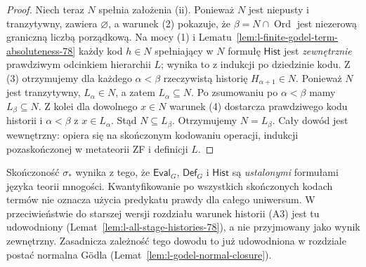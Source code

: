 \begin{proof}
Niech teraz $N$ spełnia założenia (ii).
Ponieważ $N$ jest niepusty i tranzytywny, zawiera
$\varnothing$, a warunek (2) pokazuje, że
$\beta=N\cap\operatorname{Ord}$ jest niezerową
graniczną liczbą porządkową. Na mocy (1) i
Lematu~\ref{lem:l-finite-godel-term-absoluteness-78}
każdy kod $h\in N$ spełniający w $N$ formułę
$\mathsf{Hist}$ jest \emph{zewnętrznie} prawdziwym
odcinkiem hierarchii $L$; wynika to z indukcji
po dziedzinie kodu. Z (3) otrzymujemy dla każdego
$\alpha<\beta$ rzeczywistą historię
$H_{\alpha+1}\in N$. Ponieważ $N$ jest tranzytywny,
$L_\alpha\in N$, a zatem $L_\alpha\subseteq N$.
Po zsumowaniu po $\alpha<\beta$ mamy
$L_\beta\subseteq N$.
Z kolei dla dowolnego $x\in N$ warunek (4)
dostarcza prawdziwego kodu historii i
$\alpha<\beta$ z $x\in L_\alpha$. Stąd
$N\subseteq L_\beta$. Otrzymujemy $N=L_\beta$.
Cały dowód jest wewnętrzny: opiera się na
skończonym kodowaniu operacji, indukcji
pozaskończonej w metateorii ZF i definicji $L$.
\end{proof}

\begin{uwaga}
\label{rem:l-finite-package-source}
Skończoność $\sigma_*$ wynika z tego, że
$\mathsf{Eval}_G$, $\mathsf{Def}_G$ i $\mathsf{Hist}$
są \emph{ustalonymi} formułami języka teorii
mnogości. Kwantyfikowanie po wszystkich
skończonych kodach termów nie oznacza użycia
predykatu prawdy dla całego uniwersum.
W przeciwieństwie do starszej wersji rozdziału
warunek historii (A3) jest tu udowodniony
(Lemat~\ref{lem:l-all-stage-histories-78}), a nie
przyjmowany jako wynik zewnętrzny.
Zasadnicza zależność tego dowodu to już
udowodniona w rozdziale postać normalna Gödla
(Lemat~\ref{lem:l-godel-normal-closure}).
\end{uwaga}

